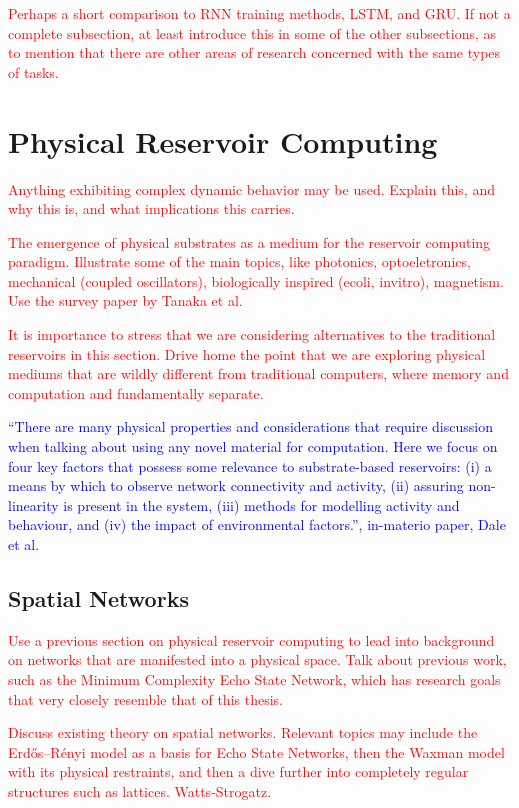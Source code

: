 \textcolor{red}{
  Perhaps a short comparison to RNN training methods, LSTM, and GRU. If not a
complete subsection, at least introduce this in some of the other subsections,
as to mention that there are other areas of research concerned with the same
types of tasks.
}

\section{Physical Reservoir Computing}

\textcolor{red}{
  Anything exhibiting complex dynamic behavior may be used. Explain this, and
why this is, and what implications this carries.
}

\textcolor{red}{
  The emergence of physical substrates as a medium for the reservoir computing
paradigm. Illustrate some of the main topics, like photonics, optoeletronics,
mechanical (coupled oscillators), biologically inspired (ecoli, invitro),
magnetism. Use the survey paper by Tanaka et al.
}

\textcolor{red}{
  It is importance to stress that we are considering alternatives to the
traditional reservoirs in this section. Drive home the point that we are
exploring physical mediums that are wildly different from traditional computers,
where memory and computation and fundamentally separate.
}

\textcolor{blue}{
  ``There are many physical properties and considerations that require
discussion when talking about using any novel material for computation. Here we
focus on four key factors that possess some relevance to substrate-based
reservoirs: (i) a means by which to observe network connectivity and activity,
(ii) assuring non-linearity is present in the system, (iii) methods for
modelling activity and behaviour, and (iv) the impact of environmental
factors.'', in-materio paper, Dale et al.
}

\subsection{Spatial Networks}

\textcolor{red}{
  Use a previous section on physical reservoir computing to lead into background
on networks that are manifested into a physical space. Talk about previous work,
such as the Minimum Complexity Echo State Network, which has research goals that
very closely resemble that of this thesis.
}

\textcolor{red}{
  Discuss existing theory on spatial networks. Relevant topics may include the
Erdős–Rényi model as a basis for Echo State Networks, then the Waxman model with
its physical restraints, and then a dive further into completely regular
structures such as lattices. Watts-Strogatz.
}

